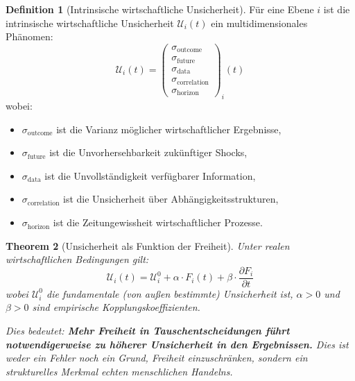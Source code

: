 \documentclass[a4paper, 12pt, twoside, openright]{report}
\newtheorem{theorem}{Theorem}[section]
\theoremstyle{definition}
\newtheorem{definition}[theorem]{Definition}
\theoremstyle{definition}
\begin{document}
\begin{definition}[Intrinsische wirtschaftliche Unsicherheit]
\label{def:unsicherheit-integral}
Für eine Ebene $i$ ist die intrinsische wirtschaftliche Unsicherheit $\mathcal{U}_i(t)$ ein multidimensionales Phänomen:
\begin{equation}
\mathcal{U}_i(t) = \left(
\begin{array}{c}
\sigma_{\text{outcome}} \\
\sigma_{\text{future}} \\
\sigma_{\text{data}} \\
\sigma_{\text{correlation}} \\
\sigma_{\text{horizon}}
\end{array}
\right)_i(t)
\end{equation}
wobei:
\begin{itemize}
\item $\sigma_{\text{outcome}}$ ist die Varianz möglicher wirtschaftlicher Ergebnisse,
\item $\sigma_{\text{future}}$ ist die Unvorhersehbarkeit zukünftiger Shocks,
\item $\sigma_{\text{data}}$ ist die Unvollständigkeit verfügbarer Information,
\item $\sigma_{\text{correlation}}$ ist die Unsicherheit über Abhängigkeitsstrukturen,
\item $\sigma_{\text{horizon}}$ ist die Zeitungewissheit wirtschaftlicher Prozesse.
\end{itemize}
\end{definition}

\begin{theorem}[Unsicherheit als Funktion der Freiheit]
\label{thm:unsicherheit-freiheit}
Unter realen wirtschaftlichen Bedingungen gilt:
\begin{equation}
\mathcal{U}_i(t) = \mathcal{U}^0_i + \alpha \cdot F_i(t) + \beta \cdot \frac{\partial F_i}{\partial t}
\end{equation}
wobei $\mathcal{U}^0_i$ die fundamentale (von außen bestimmte) Unsicherheit ist, $\alpha > 0$ und $\beta > 0$ sind empirische Kopplungskoeffizienten.

Dies bedeutet: \textbf{Mehr Freiheit in Tauschentscheidungen führt notwendigerweise zu höherer Unsicherheit in den Ergebnissen.} Dies ist weder ein Fehler noch ein Grund, Freiheit einzuschränken, sondern ein strukturelles Merkmal echten menschlichen Handelns.
\end{theorem}
\end{document}
